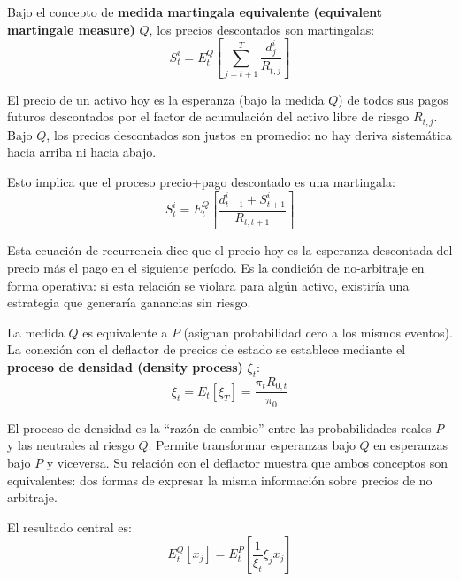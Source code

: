 \documentclass[12pt]{article}
\begin{document}
Bajo el concepto de \textbf{medida martingala equivalente (equivalent martingale measure)} $Q$, los precios descontados son martingalas:
\begin{equation}
    S_t^i = E_t^Q\left[\sum_{j=t+1}^{T} \frac{d_j^i}{R_{t,j}}\right]
\end{equation}

\begin{intuicionmat}
El precio de un activo hoy es la esperanza (bajo la medida $Q$) de todos sus pagos futuros descontados por el factor de acumulaci\'on del activo libre de riesgo $R_{t,j}$. Bajo $Q$, los precios descontados son justos en promedio: no hay deriva sistem\'atica hacia arriba ni hacia abajo.
\end{intuicionmat}

Esto implica que el proceso precio+pago descontado es una martingala:
\begin{equation}
    S_t^i = E_t^Q\left[\frac{d_{t+1}^i + S_{t+1}^i}{R_{t,t+1}}\right]
\end{equation}

\begin{intuicionmat}
Esta ecuaci\'on de recurrencia dice que el precio hoy es la esperanza descontada del precio m\'as el pago en el siguiente per\'iodo. Es la condici\'on de no-arbitraje en forma operativa: si esta relaci\'on se violara para alg\'un activo, existir\'ia una estrategia que generar\'ia ganancias sin riesgo.
\end{intuicionmat}

La medida $Q$ es equivalente a $P$ (asignan probabilidad cero a los mismos eventos). La conexi\'on con el deflactor de precios de estado se establece mediante el \textbf{proceso de densidad (density process)} $\xi_t$:
\begin{equation}
    \xi_t = E_t[\xi_T] = \frac{\pi_t R_{0,t}}{\pi_0}
\end{equation}

\begin{intuicionmat}
El proceso de densidad es la ``raz\'on de cambio'' entre las probabilidades reales $P$ y las neutrales al riesgo $Q$. Permite transformar esperanzas bajo $Q$ en esperanzas bajo $P$ y viceversa. Su relaci\'on con el deflactor muestra que ambos conceptos son equivalentes: dos formas de expresar la misma informaci\'on sobre precios de no arbitraje.
\end{intuicionmat}

El resultado central es:
\begin{equation}
    E_t^Q[x_j] = E_t^P\left[\frac{1}{\xi_t}\xi_j x_j\right]
\end{equation}
\end{document}
